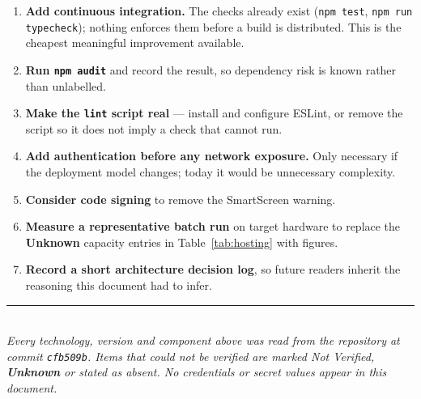 \documentclass[11pt,a4paper]{report}
\newcommand{\code}[1]{\texttt{\small #1}}
\newcommand{\nv}{\textcolor{cNote}{\textit{Not Verified}}}
\newcommand{\lblU}{\textcolor{cNote}{\textbf{Unknown}}}
\begin{document}
\begin{enumerate}
\item \textbf{Add continuous integration.} The checks already exist
(\code{npm test}, \code{npm run typecheck}); nothing enforces them before a
build is distributed. This is the cheapest meaningful improvement available.
\item \textbf{Run \code{npm audit}} and record the result, so dependency risk is
known rather than unlabelled.
\item \textbf{Make the \code{lint} script real} --- install and configure ESLint,
or remove the script so it does not imply a check that cannot run.
\item \textbf{Add authentication before any network exposure.} Only necessary if
the deployment model changes; today it would be unnecessary complexity.
\item \textbf{Consider code signing} to remove the SmartScreen warning.
\item \textbf{Measure a representative batch run} on target hardware to replace
the \lblU{} capacity entries in Table~\ref{tab:hosting} with figures.
\item \textbf{Record a short architecture decision log}, so future readers inherit
the reasoning this document had to infer.
\end{enumerate}

\vspace{1em}
\noindent\rule{\textwidth}{0.4pt}\\
\footnotesize
\textit{Every technology, version and component above was read from the
repository at commit \code{cfb509b}. Items that could not be verified are marked
\nv{}, \lblU{} or stated as absent. No credentials or secret values appear in
this document.}
\end{document}

